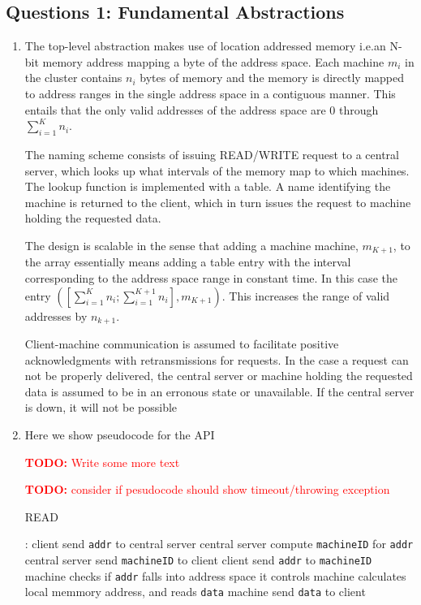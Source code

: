 \documentclass[11pt,a4paper,english]{article}
\newcommand{\todo}[1]{\textcolor{red}{\textbf{TODO: }#1}}
\begin{document}
\subsection{Questions 1: Fundamental Abstractions}
\begin{enumerate}
\item

  The top-level abstraction makes use of location addressed memory i.e.\@ an N-bit
  memory address mapping a byte of the address space. Each machine $m_i$
  in the cluster contains $n_i$
  bytes of memory and the memory is directly mapped to address ranges in the
  single address space in a contiguous manner. This entails that the only valid
  addresses of the address space are 0 through $\sum_{i=1}^{K} n_{i}$.

The naming scheme consists of issuing READ/WRITE request to a central server,
which looks up what intervals of the memory map to which machines. The lookup
function is implemented with a table. A name identifying the machine is returned
to the client, which in turn issues the request to machine holding the requested
data.

The design is scalable in the sense that adding a machine machine, $m_{K+1}$,
to the array essentially means adding a table entry with the interval
corresponding to the address space range in constant time. In this case the
entry $([\sum_{i=1}^{K} n_{i}; \sum_{i=1}^{K+1} n_{i}], m_{K+1})$.
This increases the range of valid addresses by $n_{k+1}$.

Client-machine communication is assumed to facilitate positive acknowledgments
with retransmissions for requests. In the case a request can not be properly
delivered, the central server or machine holding the requested data is assumed
to be in an erronous state or unavailable. If the central server is down, it
will not be possible

\item Here we show pseudocode for the API

\todo{Write some more text}

\todo{consider if pesudocode should show timeout/throwing exception}

\begin{algorithm}[H]
\caption{READ}
\begin{algorithmic}[1]
:
\State client send \texttt{addr} to central server
\State central server compute \texttt{machineID} for \texttt{addr}
\State central server send \texttt{machineID} to client
\smallskip
\State client send \texttt{addr} to \texttt{machineID}
\State machine checks if \texttt{addr} falls into address space it controls
\State machine calculates local memmory address, and reads \texttt{data}
\State machine send \texttt{data} to client
\EndProcedure
\end{algorithmic}
\end{algorithm}


\end{enumerate}
\end{document}
